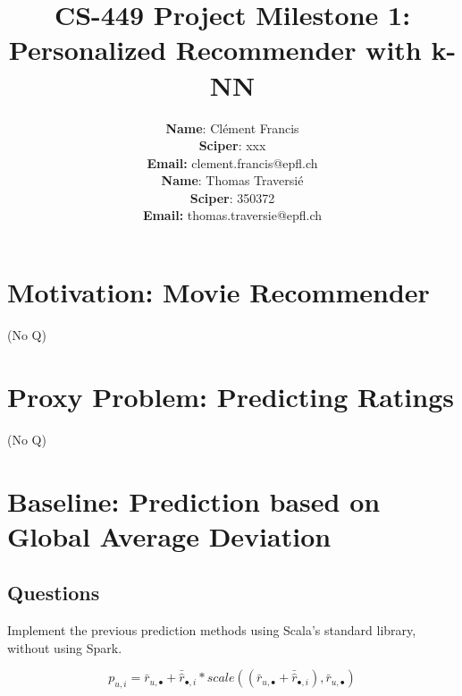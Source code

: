 \documentclass{article}
\title{CS-449 Project Milestone 1: Personalized Recommender with k-NN}
\author{
\textbf{Name}: Clément Francis\\
\textbf{Sciper}: xxx\\
\textbf{Email:} clement.francis@epfl.ch\\
\textbf{Name}: Thomas Traversié\\
\textbf{Sciper}: 350372\\
\textbf{Email:} thomas.traversie@epfl.ch\\
}
\begin{document}
\maketitle

\section{Motivation: Movie Recommender}
(No Q)
\section{Proxy Problem: Predicting Ratings}
(No Q)

\section{Baseline: Prediction based on Global Average Deviation}
\subsection{Questions}
\label{section:q1}

Implement the previous prediction methods using Scala's standard library, without using Spark.

\begin{equation}
    \label{eq:baseline}
    p_{u,i} = \bar r_{u,\bullet} + \bar{\hat r}_{\bullet,i} * scale( (\bar r_{u,\bullet} + \bar{\hat r}_{\bullet,i}), \bar r_{u,\bullet})
\end{equation}
  
\end{document}
